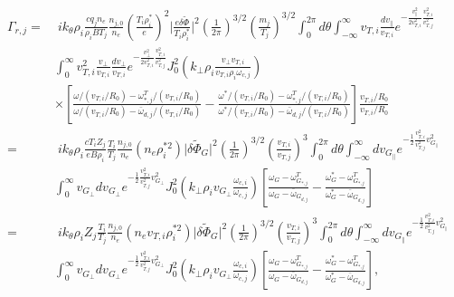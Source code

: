 \documentclass[12pt]{article}
\numberwithin{equation}{subsection}
\begin{document}
   \begin{equation}
   \begin{aligned}
      \Gamma_{r,j} =  &\;ik_\theta\rho_i\frac{cq_jn_e}{\rho_iBT_j}\frac{n_{j,0}}{n_e}(\frac{T_i\rho_i^*}{e})^2\lvert\frac{e\delta\widetilde{\Phi}}{T_i\rho_i^*}\rvert^2
                      \left(\frac{1}{2\pi}\right)^{3/2}\left(\frac{m_j}{T_j}\right)^{3/2}\int_{0}^{2\pi}d\theta\int_{-\infty}^{\infty}
                      v_{T,i}\frac{dv_\parallel}{v_{T,i}}e^{-\frac{v_\parallel^2}{2v_{T,i}^2}\frac{v_{T,i}^2}{v_{T,j}^2}}\\
                      &\int_{0}^{\infty}v_{T,i}^2\frac{v_\perp}{v_{T,i}}\frac{dv_\perp}{v_{T,i}}e^{-\frac{v_\perp^2}{2v_{T,i}^2}\frac{v_{T,i}^2}{v_{T,j}^2}}
                      J_0^2(k_\perp\rho_i \frac{v_\perp v_{T,i}}{v_{T,i}\rho_i\omega_{c,j}}) \\
                      &\times[\frac{\omega/(v_{T,i}/R_0)-\omega^T_{*,j}/(v_{T,i}/R_0)}{\omega/(v_{T,i}/R_0)-\bar{\omega}_{d,j}/(v_{T,i}/R_0)}
                             - \frac{\omega^*/(v_{T,i}/R_0)-\omega^T_{*,j}/(v_{T,i}/R_0)}{\omega^*/(v_{T,i}/R_0)-\bar{\omega}_{d,j}/(v_{T,i}/R_0)}]
                       \frac{v_{T,i}/R_0}{v_{T,i}/R_0} \\
                   =  &\;ik_\theta\rho_i\frac{cT_iZ_j}{eB\rho_i}\frac{T_i}{T_j}\frac{n_{j,0}}{n_e}(n_e\rho_i^{*2})\lvert\delta\widetilde{\Phi}_G\rvert^2
                       \left(\frac{1}{2\pi}\right)^{3/2}\left(\frac{v_{T,i}}{v_{T,j}}\right)^3\int_{0}^{2\pi}d\theta\int_{-\infty}^{\infty}
                       dv_{G_\parallel}e^{-\frac{1}{2}\frac{v_{T,i}^2}{v_{T,j}^2}{v_{G_\parallel}^2}} \\
                      &\int_{0}^{\infty}v_{G_\perp}dv_{G_\perp}e^{-\frac{1}{2}\frac{v_{T,i}^2}{v_{T,j}^2}v_{G_\perp}^2}
                       J_0^2(k_\perp\rho_iv_{G_\perp}\frac{\omega_{c,i}}{\omega_{c,j}})
                       [\frac{\omega_G-\omega^T_{G_{*,j}}}{\omega_G-\bar{\omega}_{G_{d,j}}}
                       - \frac{\omega_G^*-\omega^T_{G_{*,j}}}{\omega_G^*-\bar{\omega}_{G_{d,j}}}] \\
                   =  &\;ik_\theta\rho_iZ_j\frac{T_i}{T_j}\frac{n_{j,0}}{n_e}(n_ev_{T,i}\rho_i^{*2})\lvert\delta\widetilde{\Phi}_G\rvert^2
                       \left(\frac{1}{2\pi}\right)^{3/2}\left(\frac{v_{T,i}}{v_{T,j}}\right)^3\int_{0}^{2\pi}d\theta\int_{-\infty}^{\infty}
                       dv_{G_\parallel}e^{-\frac{1}{2}\frac{v_{T,i}^2}{v_{T,j}^2}{v_{G_\parallel}^2}} \\
                      &\int_{0}^{\infty}v_{G_\perp}dv_{G_\perp}e^{-\frac{1}{2}\frac{v_{T,i}^2}{v_{T,j}^2}v_{G_\perp}^2}
                       J_0^2(k_\perp\rho_iv_{G_\perp}\frac{\omega_{c,i}}{\omega_{c,j}})
                       [\frac{\omega_G-\omega^T_{G_{*,j}}}{\omega_G-\bar{\omega}_{G_{d,j}}}
                       - \frac{\omega_G^*-\omega^T_{G_{*,j}}}{\omega_G^*-\bar{\omega}_{G_{d,j}}}], \\
   \end{aligned}
   \end{equation}
\end{document}
